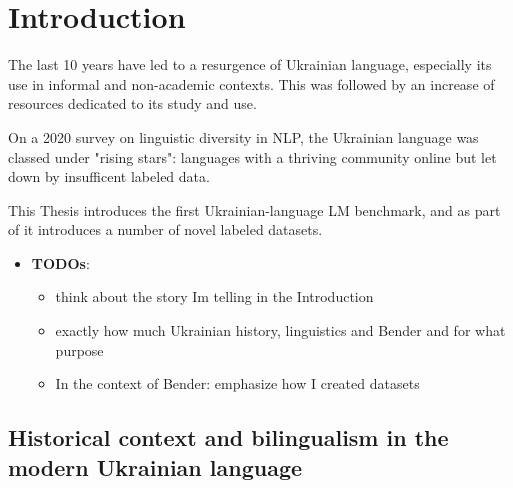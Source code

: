\chapter{Introduction}\label{ch:introduction}



The last 10 years have led to a resurgence of Ukrainian language,
especially its use in informal and non-academic contexts. This was
followed by an increase of resources dedicated to its study and use.

On a 2020 survey\cite{inclusion} on linguistic diversity in NLP, the
Ukrainian language was classed under "rising stars": languages with a
thriving community online but let down by insufficent labeled data.

This Thesis introduces the first Ukrainian-language LM benchmark, and as
part of it introduces a number of novel labeled datasets.

\begin{itemize}
\tightlist
\item
  \textbf{TODOs}:

  \begin{itemize}
  \tightlist
  \item
    think about the story I\textquotesingle m telling in the
    Introduction
  \item
    exactly how much Ukrainian history, linguistics and Bender and for
    what purpose
  \item
    In the context of Bender: emphasize how I created datasets
  \end{itemize}
\end{itemize}

\section{Historical context and bilingualism in the modern Ukrainian
language}\label{historical-context-and-bilingualism-in-the-modern-ukrainian-language}

